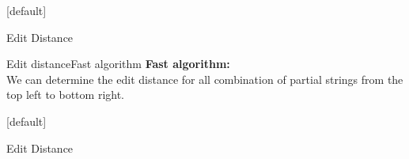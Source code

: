
{%
  [default]
  \makeatletter\def\beamer@entrycode{\vspace*{-\headheight}}\makeatother
  \begin{frame}{Edit Distance}
    \begin{center}
      \begin{adjustbox}{width=0.8\linewidth}
        \def\AlgoIntro{1}\def\AlgoFinal{0}%
        
      \end{adjustbox}
    \end{center}
  \end{frame}
}%


\begin{frame}{Edit distance}{Fast algorithm}
  \textbf{Fast algorithm:}\\
  We can determine the {\color{MainA}edit distance} for all combination
  of partial strings from the top left to bottom right.
\end{frame}


{%
  [default]
  \makeatletter\def\beamer@entrycode{\vspace*{-\headheight}}\makeatother
  \begin{frame}{Edit Distance}
    \begin{center}
      \begin{adjustbox}{width=0.8\linewidth}
        \def\AlgoIntro{0}\def\AlgoFinal{0}%
        
      \end{adjustbox}
    \end{center}
  \end{frame}
}%


